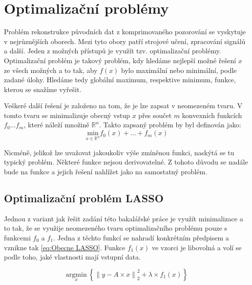 \documentclass[FM,BP]{tulthesis}
\newcounter{Vzorce}
\begin{document}
\chapter{Optimalizační problémy}
\label{ch:optproblem}
Problém rekonstrukce původních dat z komprimovaného pozorování se vyskytuje v nejrůznějších oborech.  Mezi tyto obory patří strojové učení, zpracování signálů a další. Jeden z možných přístupů je využít tzv. optimalizační problémy. Optimalizační problém je takový problém, kdy hledáme nejlepší možné řešení $x$ ze všech možných a to tak, aby $f(x)$ bylo maximální nebo minimální, podle zadané úlohy. Hledáme tedy globální maximum, respektive minimum, funkce, kterou se snažíme vyřešit. 


Veškeré další řešení je založeno na tom, že je lze zapsat v neomezeném tvaru. V tomto tvaru se minimalizuje obecný vstup $x$ přes součet $m$ konvexních funkcích $f_0 \ldots f_m$, které náleží množině $\mathbb{R}^n$. Takto zapsaný problém by byl definován jako:
\begin{equation} \label{eq:Obecny problem} \tag{Vzorec \theVzorce}
\underset{x \in \mathbb{R}^n} {\mathrm{min}} f_{0}(x)+\ldots+f_{m}(x)
\end{equation}

Nicméně, jelikož lze uvažovat jakoukoliv výše zmíněnou funkci, naskýtá se tu typický problém. Některé funkce nejsou derivovatelné. Z tohoto důvodu se nadále bude na funkce a jejich řešení nahlížet jako na samostatný problém.

\section{Optimalizační problém LASSO}
Jednou z variant jak řešit zadání této bakalářské práce je využít minimalizace a to tak, že se využije neomezeného tvaru optimalizačního problému pouze s funkcemi $f_0$ a $f_1$. Jedna z těchto funkcí se nahradí konkrétním předpisem a vznikne tak \ref{eq:Obecne LASSO}. Funkce $f_1(x)$ ve vzorci je libovolná a volí se podle toho, jaké vlastnosti mají vstupní data. 

\begin{equation} \label{eq:Obecne LASSO} \tag{Vzorec \theVzorce}
\underset{x} {\mathrm{argmin}} ~\left\{\left\|y-A \times x\right\| ^2 _2+ \lambda \times f_1(x)\right\}
\end{equation}
\end{document}
